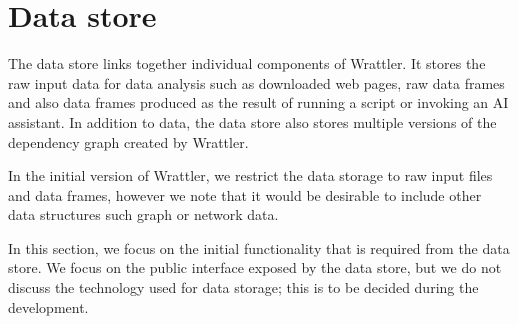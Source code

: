 \documentclass[sigplan,preprint,10pt]{acmart}\settopmatter{printfolios=true,printccs=false,printacmref=false}
\begin{document}
{\begin{comment}
*Input*:  A data frame, along with type information (continuous/categorical) for each of the columns. Desired number $k$ of rows in output.

*Output*: A list of $k$ indices of rows in the dataframe

*Potential method*:  Simplest possible implementation:
Run $k$-medoids and return the medoid values.

*Research questions:* First, are there research questions here, or is this so simple
that it  is part of the infrastructure?  If $k$-medoids is so simple for this,
why doesn't everyone also do it? How to evaluate whether the summary is good?
Maybe there are examples of data sets where medoids is not good.
For example, in the Karpathy ICML example, medoids would not make sense,
listing the institutions that have the most papers is most informative, because
it's a "long tail" type of column. How do you tell "long tail" data from "just show
the clusters" type data? Perhaps a model-based framework could distinguish?
Maybe you want to summarize the ways in which two data sets differ?
Is the best summary the cluster centroids or the "top k" along some value?
* *User interaction:* I'm not sure what interactions are enecessary.
Users could ask for more rows, mark two items as similar, or mark an item as uninteresting.
Or perhaps better would be to allow drill down, i.e., to make it easy to explore
the clusters represented by each example.
}
\end{comment}

\section{Data store}
\label{sec:datastore}

The data store links together individual components of Wrattler. It stores the raw input
data for data analysis such as downloaded web pages, raw data frames and also data frames
produced as the result of running a script or invoking an AI assistant. In addition to data,
the data store also stores multiple versions of the dependency graph created by Wrattler.

In the initial version of Wrattler, we restrict the data storage to raw input files and
data frames, however we note that it would be desirable to include other data structures
such graph or network data.

In this section, we focus on the initial functionality that is
required from the data store.  We focus on the public interface
exposed by the data store, but we do not discuss the technology used
for data storage; this is to be decided during the development.

}
\end{document}
